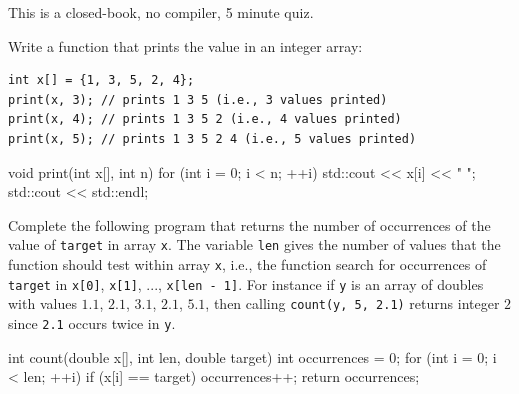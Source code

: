 

This is a closed-book, no compiler, 5 minute quiz.

\nextq
Write a function that prints the value in an integer array:
\begin{Verbatim}[frame=single,fontsize=\footnotesize]
int x[] = {1, 3, 5, 2, 4};
print(x, 3); // prints 1 3 5 (i.e., 3 values printed)
print(x, 4); // prints 1 3 5 2 (i.e., 4 values printed)
print(x, 5); // prints 1 3 5 2 4 (i.e., 5 values printed)
\end{Verbatim}
\ANSWER
\begin{answercode}
void print(int x[], int n)
{
    for (int i = 0; i < n; ++i)
    {
        std::cout << x[i] << " ";
    }
    std::cout << std::endl;
}
\end{answercode}

\nextq
Complete the following program that returns the number of occurrences of the
value of \verb!target! in array \verb!x!.
The variable \verb!len! gives the number of values that the function should
test within array \verb!x!, i.e., the function search for occurrences of
\verb!target! in \verb!x[0]!, \verb!x[1]!, ..., \verb!x[len - 1]!.
For instance if \verb!y! is an array of doubles with values
$1.1$, $2.1$, $3.1$, $2.1$, $5.1$,
then calling \verb!count(y, 5, 2.1)! returns integer $2$ since \verb!2.1!
occurs twice in \verb!y!.
\\
\ANSWER
\begin{answercode}
int count(double x[], int len, double target)
{
    int occurrences = 0;
    for (int i = 0; i < len; ++i)
    {
        if (x[i] == target)
        {
            occurrences++;
        }
    }
    return occurrences;
}
\end{answercode}


